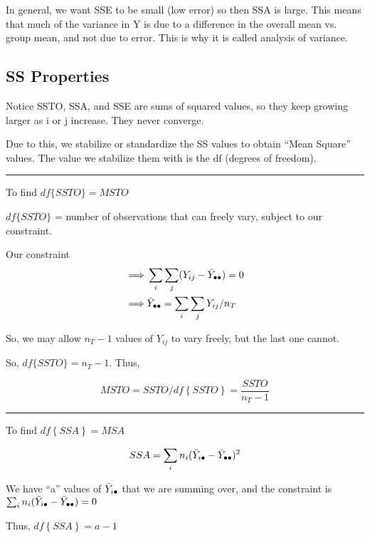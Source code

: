 \documentclass[10pt]{article}
\newcommand{\define}[1]{\colorbox{Thistle2}{#1}}
\newcommand{\emphas}[1]{\colorbox{DarkSeaGreen2}{#1}}
\newcommand{\drawline}{\noindent\rule{\linewidth}{0.1pt}}
\begin{document}
\begin{multicols}{3}
    In general, we want SSE to be small (low error) so then SSA is large. This means that much of the variance in Y is due to a difference in the overall mean vs. group mean, and not due to error. This is why it is called analysis of variance.

    \subsection{SS Properties}

    Notice SSTO, SSA, and SSE are sums of squared values, so they keep growing larger as i or j increase. They never converge.

    Due to this, we \emphas{stabilize or standardize} the SS values to obtain \define{``Mean Square''} values. The value we stabilize them with is the df (degrees of freedom).

    \drawline

    To find $df\{SSTO\} = MSTO$

    $df\{SSTO\}$ = number of observations that can freely vary, subject to our constraint.

    Our constraint 
    \begin{align*}
        \implies & \sum_i \sum_j (Y_{ij} - \bar Y_{\bullet\bullet}) = 0 \\
        \implies & \bar Y_{\bullet\bullet} = \sum_i \sum_j Y_{ij}/n_T 
    \end{align*}

    So, we may allow $n_T - 1$ values of $Y_{ij}$ to vary freely, but the last one cannot.

    So, $df\{SSTO\} = n_T - 1$. Thus,

    \newcommand{\df}[1]{df\left\{#1\right\}}
    \begin{equation*}
        MSTO = SSTO/\df{SSTO} = \frac{SSTO}{n_T-1}
    \end{equation*}

    \drawline

    To find $\df{SSA} = MSA$

    \begin{align*}
        SSA = \sum_i n_i (\bar Y_{i\bullet} - \bar Y_{\bullet\bullet})^2
    \end{align*}

    \newcommand{\bull}{\bullet\bullet}

    We have ``a'' values of $\bar Y_{i\bullet}$ that we are summing over, and the constraint is $\sum_i n_i (\bar Y_{i\bul} - \bar Y_{\bull}) = 0$

    Thus, $\df{SSA} = a - 1$


\end{multicols}
\end{document}
